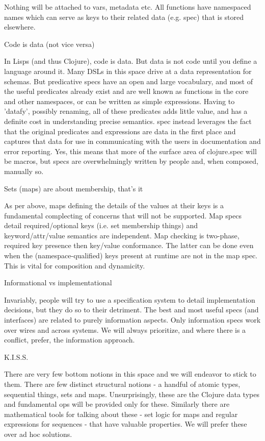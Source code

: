 Nothing will be attached to vars, metadata etc. All functions have namespaced names which can serve as keys to their related data (e.g. spec) that is stored elsewhere.

Code is data (not vice versa)

In Lisps (and thus Clojure), code is data. But data is not code until you define a language around it. Many DSLs in this space drive at a data representation for schemas. But predicative specs have an open and large vocabulary, and most of the useful predicates already exist and are well known as functions in the core and other namespaces, or can be written as simple expressions. Having to 'datafy', possibly renaming, all of these predicates adds little value, and has a definite cost in understanding precise semantics. spec instead leverages the fact that the original predicates and expressions are data in the first place and captures that data for use in communicating with the users in documentation and error reporting. Yes, this means that more of the surface area of clojure.spec will be macros, but specs are overwhelmingly written by people and, when composed, manually so.

Sets (maps) are about membership, that’s it

As per above, maps defining the details of the values at their keys is a fundamental complecting of concerns that will not be supported. Map specs detail required/optional keys (i.e. set membership things) and keyword/attr/value semantics are independent. Map checking is two-phase, required key presence then key/value conformance. The latter can be done even when the (namespace-qualified) keys present at runtime are not in the map spec. This is vital for composition and dynamicity.

Informational vs implementational

Invariably, people will try to use a specification system to detail implementation decisions, but they do so to their detriment. The best and most useful specs (and interfaces) are related to purely information aspects. Only information specs work over wires and across systems. We will always prioritize, and where there is a conflict, prefer, the information approach.

K.I.S.S.

There are very few bottom notions in this space and we will endeavor to stick to them. There are few distinct structural notions - a handful of atomic types, sequential things, sets and maps. Unsurprisingly, these are the Clojure data types and fundamental ops will be provided only for these. Similarly there are mathematical tools for talking about these - set logic for maps and regular expressions for sequences - that have valuable properties. We will prefer these over ad hoc solutions.

